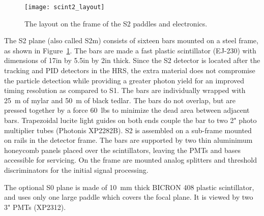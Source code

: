 \begin{figure}[tbh]
  \begin{center}
    \texttt{[image: scint2\_layout]}
    \caption[Detectors: S2 Layout]{The layout on the frame of the S2 paddles and
    electronics.}
    \label{fig:s2layout}
  \end{center}
\end{figure}
The S2 plane (also called S2m) consists of sixteen bars mounted on a steel
frame, as shown in Figure~\ref{fig:s2layout}. The bars are made a fast
plastic scintillator (EJ-230) with dimensions of 17\unit{in} by
5.5\unit{in} by 2\unit{in} thick. Since the S2 detector is located after
the tracking and PID 
detectors in the HRS, the extra material does not compromise the particle
detection while providing a greater photon yield for an improved timing
resolution as compared to S1. The bars are individually wrapped with
25\unit{\mu m} of mylar and 50\unit{\mu m} of black tedlar. The bars do not
overlap, but are pressed together by a force 60~lbs to minimize the dead
area between adjacent bars. Trapezoidal lucite light guides on both ends
couple the bar to two 2" photo multiplier tubes (Photonis XP2282B). S2 is
assembled on a sub-frame mounted on rails in the detector frame. The bars
are supported by two thin aluminimum honeycomb panels placed over the
scintillators, leaving the PMTs and bases accessible for servicing. On the
frame are mounted analog splitters and threshold discriminators for the
initial signal processing.

The optional S0 plane is made of 10~mm thick BICRON 408 plastic
scintillator, and uses only one large paddle which covers the focal
plane. It is viewed by two 3" PMTs (XP2312).

